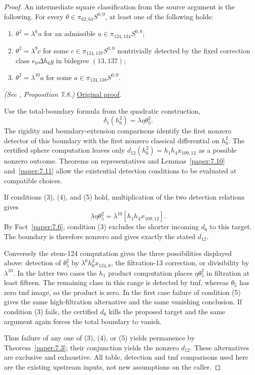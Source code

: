 \begin{proof}
An intermediate square classification from the source argument is the following.
For every $\theta\in\pi_{62,64}S^{0,0}$, at least one of the following holds:
\begin{enumerate}
\item $\theta^2=\lambda^6u$ for an admissible $u\in\pi_{124,134}S^{0,0}$;
\item $\theta^2=\lambda^9c$ for some $c\in\pi_{124,137}S^{0,0}$ nontrivially detected by the fixed correction class $e_0\Delta h_6g$ in bidegree $(13,137)$;
\item $\theta^2=\lambda^{10}a$ for some $a\in\pi_{124,138}S^{0,0}$.
\end{enumerate}

\textit{(See \cite{LWX126}, Proposition 7.8.)} \href{paper/main.tex.html#L2300}{Original proof}.

Use the total-boundary formula from the quadratic construction,
\[
 \delta_1(h_6^2)=\lambda\eta\theta_5^2.
\]
The rigidity and boundary-extension comparisons identify the first nonzero detector of this boundary with the first nonzero classical differential on $h_6^2$. The certified sphere computation leaves only $d_{12}(h_6^2)=h_1h_4x_{109,12}$ as a possible nonzero outcome. Theorems on representatives and Lemmas~\ref{paper:7.10} and~\ref{paper:7.11} allow the existential detection conditions to be evaluated at compatible choices.

If conditions (3), (4), and (5) hold, multiplication of the two detection relations gives
\[
 \lambda\eta\theta_5^2=\lambda^{10}[h_1h_4x_{109,12}].
\]
By Fact~\ref{paper:7.6}, condition (3) excludes the shorter incoming $d_6$ to this target. The boundary is therefore nonzero and gives exactly the stated $d_{12}$.

Conversely the stem-124 computation gives the three possibilities displayed above: detection of $\theta_5^2$ by $\lambda^6h_0^2x_{124,8}$, the filtration-13 correction, or divisibility by $\lambda^{10}$. In the latter two cases the $h_1$ product computation places $\eta\theta_5^2$ in filtration at least fifteen. The remaining class in this range is detected by tmf, whereas $\theta_5$ has zero tmf image, so the product is zero. In the first case failure of condition (5) gives the same high-filtration alternative and the same vanishing conclusion. If condition (3) fails, the certified $d_6$ kills the proposed target and the same argument again forces the total boundary to vanish.

Thus failure of any one of (3), (4), or (5) yields permanence by Theorem~\ref{paper:7.3}; their conjunction yields the nonzero $d_{12}$. These alternatives are exclusive and exhaustive. All table, detection and tmf comparisons used here are the existing upstream inputs, not new assumptions on the caller.
\end{proof}

